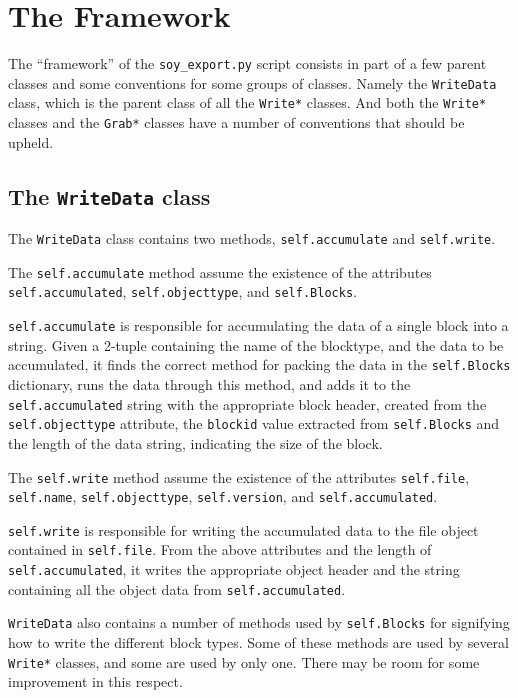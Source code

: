 

\section*{The Framework}
The ``framework'' of the \texttt{soy\_export.py} script consists in part of a few parent classes and some conventions for some groups of classes. Namely the \texttt{WriteData} class, which is the parent class of all the \texttt{Write*} classes. And both the \texttt{Write*} classes and the \texttt{Grab*} classes have a number of conventions that should be upheld.

\subsection*{The \texttt{WriteData} class}
The \texttt{WriteData} class contains two methods, \texttt{self.accumulate} and \texttt{self.write}.

The \texttt{self.accumulate} method assume the existence of the attributes \\ \texttt{self.accumulated}, \texttt{self.objecttype}, and \texttt{self.Blocks}.

\texttt{self.accumulate} is responsible for accumulating the data of a single block into a string. Given a 2-tuple containing the name of the blocktype, and the data to be accumulated, it finds the correct method for packing the data in the \texttt{self.Blocks} dictionary, runs the data through this method, and adds it to the \texttt{self.accumulated} string with the appropriate block header, created from the \texttt{self.objecttype} attribute, the \texttt{blockid} value extracted from \texttt{self.Blocks} and the length of the data string, indicating the size of the block.

The \texttt{self.write} method assume the existence of the attributes \texttt{self.file}, \texttt{self.name}, \texttt{self.objecttype}, \texttt{self.version}, and \texttt{self.accumulated}.

\texttt{self.write} is responsible for writing the accumulated data to the file object contained in \texttt{self.file}. From the above attributes and the length of \texttt{self.accumulated}, it writes the appropriate object header and the string containing all the object data from \texttt{self.accumulated}.

\texttt{WriteData} also contains a number of methods used by \texttt{self.Blocks} for signifying how to write the different block types. Some of these methods are used by several \texttt{Write*} classes, and some are used by only one. There may be room for some improvement in this respect.

